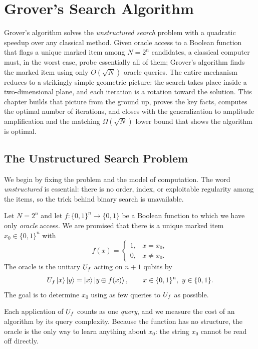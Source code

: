 \chapter{Grover's Search Algorithm}

\providecommand{\ketbra}[2]{\ket{#1}\!\bra{#2}}

Grover's algorithm solves the \emph{unstructured search} problem with a
quadratic speedup over any classical method. Given oracle access to a Boolean
function that flags a unique marked item among $N=2^{n}$ candidates, a classical
computer must, in the worst case, probe essentially all of them; Grover's
algorithm finds the marked item using only $O(\sqrt N)$ oracle queries. The
entire mechanism reduces to a strikingly simple geometric picture: the search
takes place inside a two-dimensional plane, and each iteration is a rotation
toward the solution. This chapter builds that picture from the ground up, proves
the key facts, computes the optimal number of iterations, and closes with the
generalization to amplitude amplification and the matching $\Omega(\sqrt N)$
lower bound that shows the algorithm is optimal.

\section{The Unstructured Search Problem}

We begin by fixing the problem and the model of computation. The word
\emph{unstructured} is essential: there is no order, index, or exploitable
regularity among the items, so the trick behind binary search is unavailable.

\begin{definition}
Let $N=2^{n}$ and let $f\colon\{0,1\}^{n}\to\{0,1\}$ be a Boolean function to
which we have only \emph{oracle} access. We are promised that there is a unique
marked item $x_0\in\{0,1\}^{n}$ with
\[
  f(x)=\begin{cases}1,& x=x_0,\\ 0,& x\neq x_0.\end{cases}
\]
The oracle is the unitary $U_f$ acting on $n+1$ qubits by
\[
  U_f\ket{x}\ket{y}=\ket{x}\ket{y\oplus f(x)},
  \qquad x\in\{0,1\}^{n},\ y\in\{0,1\}.
\]
The goal is to determine $x_0$ using as few queries to $U_f$ as possible.
\end{definition}

Each application of $U_f$ counts as one \emph{query}, and we measure the cost of
an algorithm by its query complexity. Because the function has no structure, the
oracle is the only way to learn anything about $x_0$: the string $x_0$ cannot be
read off directly.

